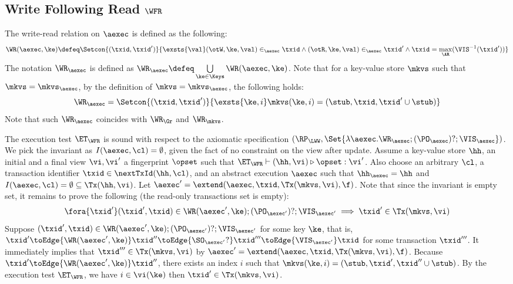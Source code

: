 \subsection{Write Following Read \( \WFR \) }
\label{sec:sound-complete-wfr}

The write-read relation  on \( \aexec \) is defined as the following:
\[
\WR(\aexec, \ke) \defeq \Setcon{ (\txid, \txid') }{ \exsts{\val} (\otW, \ke, \val) \in_\aexec \txid \land (\otR, \ke, \val) \in_\aexec \txid' \land \txid = \max_\AR(\VIS^{-1}(\txid')) }
\]
The notation \( \WR_\aexec \) is defined as \( \WR_\aexec \defeq \bigcup\limits_{\ke \in \Keys} \WR(\aexec, \ke) \).
Note that for a key-value store \( \mkvs \) such that \( \mkvs = \mkvs_\aexec \),
by the definition of  \(  \mkvs = \mkvs_\aexec \), 
the following holds:
\[
    \WR_\aexec = \Setcon{(\txid, \txid')}{\exsts{\ke, i } \mkvs(\ke, i) = (\stub, \txid, \txid'\cup \stub)}
\]
Note that such \( \WR_\aexec \) coincides with \( \WR_\Gr \) and \( \WR_\mkvs \).

The execution test $\ET_\WFR$ is sound with respect to the axiomatic specification 
\( (\RP_{\LWW}, \Set{\lambda \aexec. \WR_\aexec ; (\PO_{\aexec})? ; \VIS_{\aexec} })\).
We pick the invariant as \( I( \aexec, \cl ) = \emptyset \), given the fact of no constraint on the view after update.
Assume a key-value store $\hh$, an initial and a final view $\vi, \vi'$  a fingerprint $\opset$ 
such that $\ET_{\WFR} \vdash (\hh, \vi) \triangleright \opset: \vi'$. 
Also choose an arbitrary $\cl$, a transaction identifier $\txid \in \nextTxId(\hh, \cl)$, 
and an abstract execution $\aexec$ such that $\hh_{\aexec} = \hh$ and 
\( I(\aexec, \cl) =  \emptyset \subseteq \Tx(\hh, \vi) \).
Let \( \aexec' = \extend(\aexec, \txid, \Tx(\mkvs, \vi) , \f ) \).
Note that since the invariant is empty set, it remains to prove the following (the read-only transactions set is empty):
\[
    \begin{array}{@{}l@{}}
        \fora{ \txid' } 
        (\txid' ,\txid)  \in \WR(\aexec',\ke) ; (\PO_{\aexec'})? ; \VIS_{\aexec'} 
        \implies \txid' \in \Tx(\mkvs, \vi) 
    \end{array}
\]
Suppose \( (\txid' ,\txid)  \in \WR(\aexec', \ke) ; (\PO_{\aexec'})? ; \VIS_{\aexec'} \) for some key \( \ke \),
that is, \( \txid' \toEdge{\WR(\aexec', \ke)} \txid'' \toEdge{\SO_{\aexec'}?} \txid''' \toEdge{\VIS_{\aexec'}} \txid \) for some transaction \( \txid''' \).
It immediately implies that \( \txid''' \in \Tx(\mkvs, \vi)  \) by \( \aexec' = \extend(\aexec, \txid, \Tx(\mkvs, \vi) , \f ) \).
Because \( \txid' \toEdge{\WR(\aexec', \ke)} \txid'' \), there exists an index \( i \) such that \( \mkvs(\ke, i) = (\stub, \txid', \txid'' \cup \stub) \).
By the execution test \( \ET_\WFR \), we have \( i \in \vi( \ke ) \) then \( \txid' \in \Tx(\mkvs, \vi ) \).


